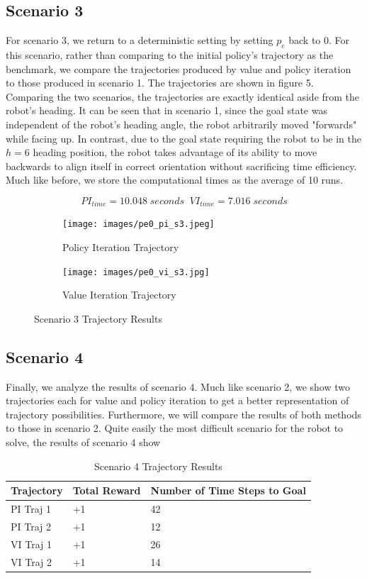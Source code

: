 \documentclass[fullpage]{article}
\begin{document}
\subsection{Scenario 3}

For scenario 3, we return to a deterministic setting by setting $p_e$ back to 0. For this scenario, rather than comparing to the initial policy's trajectory as the benchmark, we compare the trajectories produced by value and policy iteration to those produced in scenario 1. The trajectories are shown in figure 5. Comparing the two scenarios, the trajectories are exactly identical aside from the robot's heading. It can be seen that in scenario 1, since the goal state was independent of the robot's heading angle, the robot arbitrarily moved "forwards" while facing up. In contrast, due to the goal state requiring the robot to be in the $h=6$ heading position, the robot takes advantage of its ability to move backwards to align itself in correct orientation without sacrificing time efficiency. Much like before, we store the computational times as the average of 10 runs.

\[
PI_{time} = 10.048 \; seconds \; \; VI_{time} = 7.016 \; seconds
\]

\begin{figure}[H]
\begin{subfigure}{.5\textwidth}
\centering
\texttt{[image: images/pe0\_pi\_s3.jpeg]}
\caption{Policy Iteration Trajectory}
\label{fig:a}
\end{subfigure}
\begin{subfigure}{.5\textwidth}
\centering
\texttt{[image: images/pe0\_vi\_s3.jpg]}
\caption{Value Iteration Trajectory}
\label{fig:b}
\end{subfigure}
\caption{Scenario 3 Trajectory Results}
\end{figure}

\subsection{Scenario 4}

Finally, we analyze the results of scenario 4. Much like scenario 2, we show two trajectories each for value and policy iteration to get a better representation of trajectory possibilities. Furthermore, we will compare the results of both methods to those in scenario 2. Quite easily the most difficult scenario for the robot to solve, the results of scenario 4 show 


\begin{table}[H]
\centering
\begin{tabular}{lll}
\hline
Trajectory & Total Reward & Number of Time Steps to Goal \\ \hline
PI Traj 1  & +1           & 42                           \\
PI Traj 2  & +1           & 12                           \\
VI Traj 1  & +1           & 26                           \\
VI Traj 2  & +1           & 14                          
\end{tabular}
\caption{Scenario 4 Trajectory Results}
\end{table}
\end{document}
